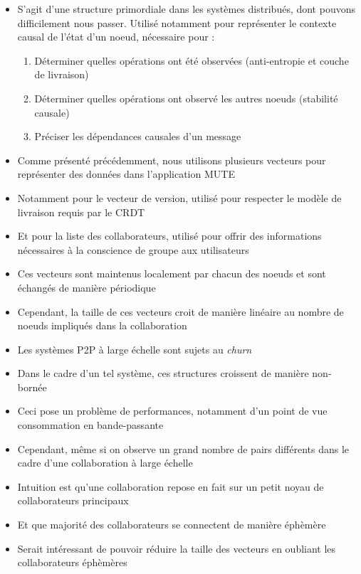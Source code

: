 \begin{itemize}
    \item S'agit d'une structure primordiale dans les systèmes distribués, dont pouvons difficilement nous passer.
      Utilisé notamment pour représenter le contexte causal de l'état d'un noeud, nécessaire pour :
      \begin{enumerate}
        \item Déterminer quelles opérations ont été observées (anti-entropie et couche de livraison)
        \item Déterminer quelles opérations ont observé les autres noeuds (stabilité causale)
        \item Préciser les dépendances causales d'un message
      \end{enumerate}
    \item Comme présenté précédemment, nous utilisons plusieurs vecteurs pour représenter des données dans l'application MUTE
    \item Notamment pour le vecteur de version, utilisé pour respecter le modèle de livraison requis par le \ac{CRDT}
    \item Et pour la liste des collaborateurs, utilisé pour offrir des informations nécessaires à la conscience de groupe aux utilisateurs
    \item Ces vecteurs sont maintenus localement par chacun des noeuds et sont échangés de manière périodique
    \item Cependant, la taille de ces vecteurs croit de manière linéaire au nombre de noeuds impliqués dans la collaboration
    \item Les systèmes \ac{P2P} à large échelle sont sujets au \emph{churn}
    \item Dans le cadre d'un tel système, ces structures croissent de manière non-bornée
    \item Ceci pose un problème de performances, notamment d'un point de vue consommation en bande-passante
    \item Cependant, même si on observe un grand nombre de pairs différents dans le cadre d'une collaboration à large échelle
    \item Intuition est qu'une collaboration repose en fait sur un petit noyau de collaborateurs principaux
    \item Et que majorité des collaborateurs se connectent de manière éphèmère
    \item Serait intéressant de pouvoir réduire la taille des vecteurs en oubliant les collaborateurs éphèmères

\end{itemize}

